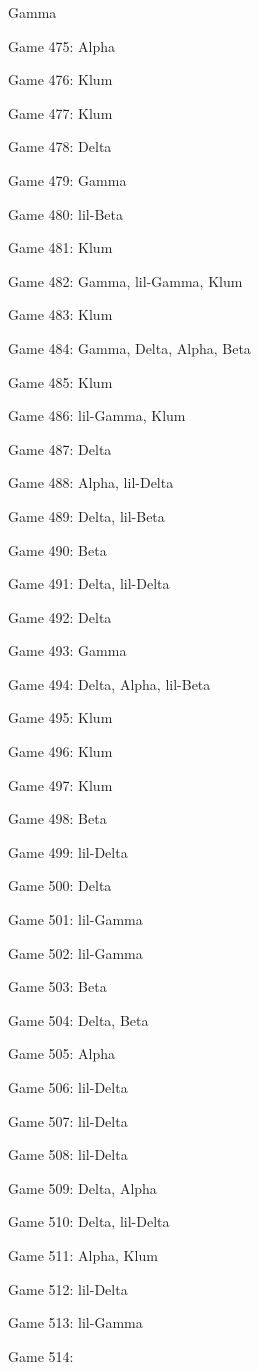 \documentclass{article}
\begin{document}
\begin{multicols}{3}
\begin{compactitem}
Gamma
\item Game 475:
Alpha
\item Game 476:
Klum
\item Game 477:
Klum
\item Game 478:
Delta
\item Game 479:
Gamma
\item Game 480:
lil-Beta
\item Game 481:
Klum
\item Game 482:
Gamma, lil-Gamma, Klum
\item Game 483:
Klum
\item Game 484:
Gamma, Delta, Alpha, Beta
\item Game 485:
Klum
\item Game 486:
lil-Gamma, Klum
\item Game 487:
Delta
\item Game 488:
Alpha, lil-Delta
\item Game 489:
Delta, lil-Beta
\item Game 490:
Beta
\item Game 491:
Delta, lil-Delta
\item Game 492:
Delta
\item Game 493:
Gamma
\item Game 494:
Delta, Alpha, lil-Beta
\item Game 495:
Klum
\item Game 496:
Klum
\item Game 497:
Klum
\item Game 498:
Beta
\item Game 499:
lil-Delta
\item Game 500:
Delta
\item Game 501:
lil-Gamma
\item Game 502:
lil-Gamma
\item Game 503:
Beta
\item Game 504:
Delta, Beta
\item Game 505:
Alpha
\item Game 506:
lil-Delta
\item Game 507:
lil-Delta
\item Game 508:
lil-Delta
\item Game 509:
Delta, Alpha
\item Game 510:
Delta, lil-Delta
\item Game 511:
Alpha, Klum
\item Game 512:
lil-Delta
\item Game 513:
lil-Gamma
\item Game 514:

\end{compactitem}
\end{multicols}
\end{document}
